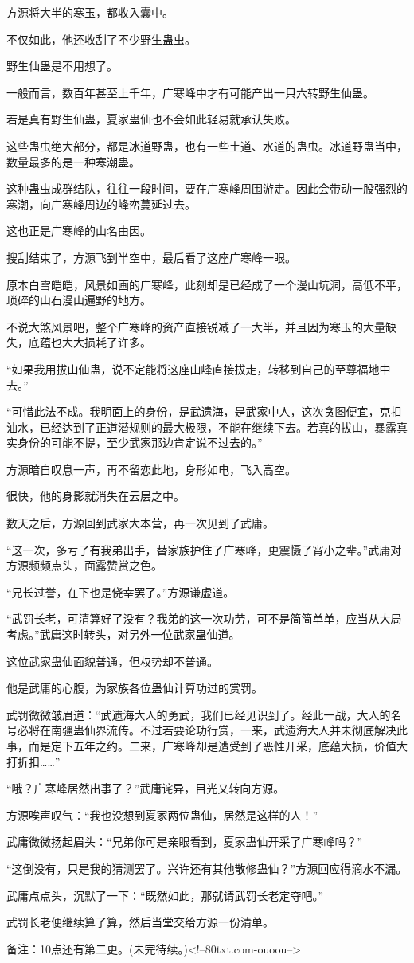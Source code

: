\begin{this_body}
方源将大半的寒玉，都收入囊中。

不仅如此，他还收刮了不少野生蛊虫。

野生仙蛊是不用想了。

一般而言，数百年甚至上千年，广寒峰中才有可能产出一只六转野生仙蛊。

若是真有野生仙蛊，夏家蛊仙也不会如此轻易就承认失败。

这些蛊虫绝大部分，都是冰道野蛊，也有一些土道、水道的蛊虫。冰道野蛊当中，数量最多的是一种寒潮蛊。

这种蛊虫成群结队，往往一段时间，要在广寒峰周围游走。因此会带动一股强烈的寒潮，向广寒峰周边的峰峦蔓延过去。

这也正是广寒峰的山名由因。

搜刮结束了，方源飞到半空中，最后看了这座广寒峰一眼。

原本白雪皑皑，风景如画的广寒峰，此刻却是已经成了一个漫山坑洞，高低不平，琐碎的山石漫山遍野的地方。

不说大煞风景吧，整个广寒峰的资产直接锐减了一大半，并且因为寒玉的大量缺失，底蕴也大大损耗了许多。

“如果我用拔山仙蛊，说不定能将这座山峰直接拔走，转移到自己的至尊福地中去。”

“可惜此法不成。我明面上的身份，是武遗海，是武家中人，这次贪图便宜，克扣油水，已经达到了正道潜规则的最大极限，不能在继续下去。若真的拔山，暴露真实身份的可能不提，至少武家那边肯定说不过去的。”

方源暗自叹息一声，再不留恋此地，身形如电，飞入高空。

很快，他的身影就消失在云层之中。

数天之后，方源回到武家大本营，再一次见到了武庸。

“这一次，多亏了有我弟出手，替家族护住了广寒峰，更震慑了宵小之辈。”武庸对方源频频点头，面露赞赏之色。

“兄长过誉，在下也是侥幸罢了。”方源谦虚道。

“武罚长老，可清算好了没有？我弟的这一次功劳，可不是简简单单，应当从大局考虑。”武庸这时转头，对另外一位武家蛊仙道。

这位武家蛊仙面貌普通，但权势却不普通。

他是武庸的心腹，为家族各位蛊仙计算功过的赏罚。

武罚微微皱眉道：“武遗海大人的勇武，我们已经见识到了。经此一战，大人的名号必将在南疆蛊仙界流传。不过若要论功行赏，一来，武遗海大人并未彻底解决此事，而是定下五年之约。二来，广寒峰却是遭受到了恶性开采，底蕴大损，价值大打折扣……”

“哦？广寒峰居然出事了？”武庸诧异，目光又转向方源。

方源唉声叹气：“我也没想到夏家两位蛊仙，居然是这样的人！”

武庸微微扬起眉头：“兄弟你可是亲眼看到，夏家蛊仙开采了广寒峰吗？”

“这倒没有，只是我的猜测罢了。兴许还有其他散修蛊仙？”方源回应得滴水不漏。

武庸点点头，沉默了一下：“既然如此，那就请武罚长老定夺吧。”

武罚长老便继续算了算，然后当堂交给方源一份清单。

备注：10点还有第二更。(未完待续。)<!--80txt.com-ouoou-->

\end{this_body}

